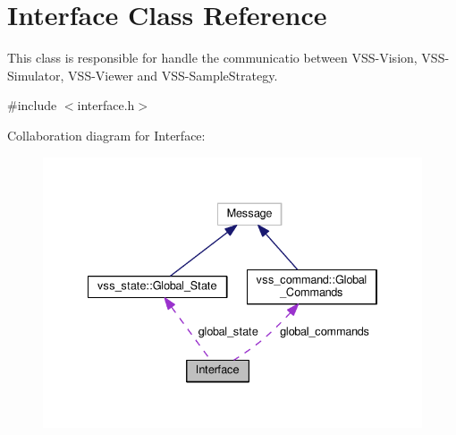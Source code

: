 \hypertarget{classInterface}{\section{Interface Class Reference}
\label{classInterface}
}


This class is responsible for handle the communicatio between V\-S\-S-\/\-Vision, V\-S\-S-\/\-Simulator, V\-S\-S-\/\-Viewer and V\-S\-S-\/\-Sample\-Strategy.  




{\ttfamily \#include $<$interface.\-h$>$}



Collaboration diagram for Interface\-:
\nopagebreak
\begin{figure}[H]
\begin{center}
\leavevmode
\includegraphics[width=334pt]{classInterface__coll__graph}
\end{center}
\end{figure}
